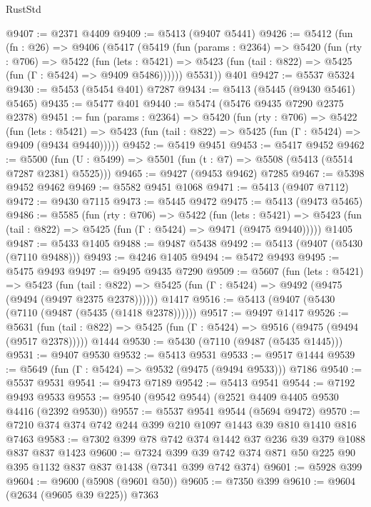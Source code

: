 \begin{lexlean}{RustStd}
\begin{coremodule}
@9407 := @2371 @4409
@9409 := @5413 (@9407 @5441)
@9426 := @5412
    (fun (fn : @26) =>
    @9406
      (@5417
        (@5419
          (fun (params : @2364) =>
          @5420
            (fun (rty : @706) =>
            @5422
              (fun (lets : @5421) =>
              @5423 (fun (tail : @822) => @5425 (fun (Γ : @5424) => @9409 @5486))))))
        @5531))
    @401
@9427 := @5537 @5324
@9430 := @5453 (@5454 @401) @7287
@9434 := @5413 (@5445 (@9430 @5461) @5465)
@9435 := @5477 @401
@9440 := @5474 (@5476 @9435 @7290 @2375 @2378)
@9451 := fun (params : @2364) =>
  @5420
    (fun (rty : @706) =>
    @5422
      (fun (lets : @5421) =>
      @5423 (fun (tail : @822) => @5425 (fun (Γ : @5424) => @9409 (@9434 @9440)))))
@9452 := @5419 @9451
@9453 := @5417 @9452
@9462 := @5500 (fun (U : @5499) => @5501 (fun (t : @7) => @5508 (@5413 (@5514 @7287 @2381) @5525)))
@9465 := @9427 (@9453 @9462) @7285
@9467 := @5398 @9452 @9462
@9469 := @5582 @9451 @1068
@9471 := @5413 (@9407 @7112)
@9472 := @9430 @7115
@9473 := @5445 @9472
@9475 := @5413 (@9473 @5465)
@9486 := @5585
    (fun (rty : @706) =>
    @5422
      (fun (lets : @5421) =>
      @5423 (fun (tail : @822) => @5425 (fun (Γ : @5424) => @9471 (@9475 @9440)))))
    @1405
@9487 := @5433 @1405
@9488 := @9487 @5438
@9492 := @5413 (@9407 (@5430 (@7110 @9488)))
@9493 := @4246 @1405
@9494 := @5472 @9493
@9495 := @5475 @9493
@9497 := @9495 @9435 @7290
@9509 := @5607
    (fun (lets : @5421) =>
    @5423
      (fun (tail : @822) => @5425 (fun (Γ : @5424) => @9492 (@9475 (@9494 (@9497 @2375 @2378))))))
    @1417
@9516 := @5413 (@9407 (@5430 (@7110 (@9487 (@5435 (@1418 @2378))))))
@9517 := @9497 @1417
@9526 := @5631
    (fun (tail : @822) => @5425 (fun (Γ : @5424) => @9516 (@9475 (@9494 (@9517 @2378)))))
    @1444
@9530 := @5430 (@7110 (@9487 (@5435 @1445)))
@9531 := @9407 @9530
@9532 := @5413 @9531
@9533 := @9517 @1444
@9539 := @5649 (fun (Γ : @5424) => @9532 (@9475 (@9494 @9533))) @7186
@9540 := @5537 @9531
@9541 := @9473 @7189
@9542 := @5413 @9541
@9544 := @7192 @9493 @9533
@9553 := @9540 (@9542 @9544) (@2521 @4409 @4405 @9530 @4416 (@2392 @9530))
@9557 := @5537 @9541 @9544 (@5694 @9472)
@9570 := @7210 @374 @374 @742 @244 @399 @210 @1097 @1443 @39 @810 @1410 @816 @7463
@9583 := @7302 @399 @78 @742 @374 @1442 @37 @236 @39 @379 @1088 @837 @837 @1423
@9600 := @7324
    @399
    @39
    @742
    @374
    @871
    @50
    @225
    @90
    @395
    @1132
    @837
    @837
    @1438
    (@7341 @399 @742 @374)
@9601 := @5928 @399
@9604 := @9600 (@5908 (@9601 @50))
@9605 := @7350 @399
@9610 := @9604 (@2634 (@9605 @39 @225)) @7363

\end{coremodule}
\end{lexlean}
